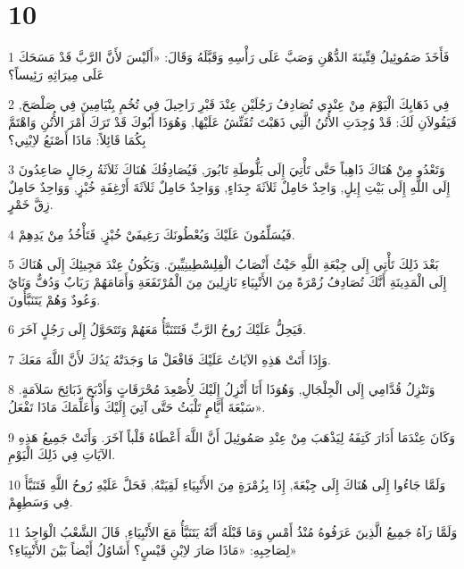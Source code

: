 \chapter{10}

\par 1 فَأَخَذَ صَمُوئِيلُ قِنِّينَةَ الدُّهْنِ وَصَبَّ عَلَى رَأْسِهِ وَقَبَّلَهُ وَقَالَ: «أَلَيْسَ لأَنَّ الرَّبَّ قَدْ مَسَحَكَ عَلَى مِيرَاثِهِ رَئِيساً؟
\par 2 فِي ذَهَابِكَ الْيَوْمَ مِنْ عِنْدِي تُصَادِفُ رَجُلَيْنِ عِنْدَ قَبْرِ رَاحِيلَ فِي تُخُمِ بِنْيَامِينَ فِي صَلْصَحَ, فَيَقُولاَنِ لَكَ: قَدْ وُجِدَتِ الأُتُنُ الَّتِي ذَهَبْتَ تُفَتِّشُ عَلَيْهَا, وَهُوَذَا أَبُوكَ قَدْ تَرَكَ أَمْرَ الأُتُنِ وَاهْتَمَّ بِكُمَا قَائِلاً: مَاذَا أَصْنَعُ لاِبْنِي؟
\par 3 وَتَعْدُو مِنْ هُنَاكَ ذَاهِباً حَتَّى تَأْتِيَ إِلَى بَلُّوطَةِ تَابُورَ, فَيُصَادِفُكَ هُنَاكَ ثَلاَثَةُ رِجَالٍ صَاعِدُونَ إِلَى اللَّهِ إِلَى بَيْتِ إِيلٍ, وَاحِدٌ حَامِلٌ ثَلاَثَةَ جِدَاءٍ, وَوَاحِدٌ حَامِلٌ ثَلاَثَةَ أَرْغِفَةِ خُبْزٍ, وَوَاحِدٌ حَامِلٌ زِقَّ خَمْرٍ.
\par 4 فَيُسَلِّمُونَ عَلَيْكَ وَيُعْطُونَكَ رَغِيفَيْ خُبْزٍ, فَتَأْخُذُ مِنْ يَدِهِمْ.
\par 5 بَعْدَ ذَلِكَ تَأْتِي إِلَى جِبْعَةِ اللَّهِ حَيْثُ أَنْصَابُ الْفِلِسْطِينِيِّينَ. وَيَكُونُ عِنْدَ مَجِيئِكَ إِلَى هُنَاكَ إِلَى الْمَدِينَةِ أَنَّكَ تُصَادِفُ زُمْرَةً مِنَ الأَنْبِيَاءِ نَازِلِينَ مِنَ الْمُرْتَفَعَةِ وَأَمَامَهُمْ رَبَابٌ وَدُفٌّ وَنَايٌ وَعُودٌ وَهُمْ يَتَنَبَّأُونَ.
\par 6 فَيَحِلُّ عَلَيْكَ رُوحُ الرَّبِّ فَتَتَنَبَّأُ مَعَهُمْ وَتَتَحَوَّلُ إِلَى رَجُلٍ آخَرَ.
\par 7 وَإِذَا أَتَتْ هَذِهِ الآيَاتُ عَلَيْكَ فَافْعَلْ مَا وَجَدَتْهُ يَدُكَ لأَنَّ اللَّهَ مَعَكَ.
\par 8 وَتَنْزِلُ قُدَّامِي إِلَى الْجِلْجَالِ, وَهُوَذَا أَنَا أَنْزِلُ إِلَيْكَ لِأُصْعِدَ مُحْرَقَاتٍ وَأَذْبَحَ ذَبَائِحَ سَلاَمَةٍ. سَبْعَةَ أَيَّامٍ تَلْبَثُ حَتَّى آتِيَ إِلَيْكَ وَأُعَلِّمَكَ مَاذَا تَفْعَلُ».
\par 9 وَكَانَ عِنْدَمَا أَدَارَ كَتِفَهُ لِيَذْهَبَ مِنْ عِنْدِ صَمُوئِيلَ أَنَّ اللَّهَ أَعْطَاهُ قَلْباً آخَرَ. وَأَتَتْ جَمِيعُ هَذِهِ الآيَاتِ فِي ذَلِكَ الْيَوْمِ.
\par 10 وَلَمَّا جَاءُوا إِلَى هُنَاكَ إِلَى جِبْعَةَ, إِذَا بِزُمْرَةٍ مِنَ الأَنْبِيَاءِ لَقِيَتْهُ, فَحَلَّ عَلَيْهِ رُوحُ اللَّهِ فَتَنَبَّأَ فِي وَسَطِهِمْ.
\par 11 وَلَمَّا رَآهُ جَمِيعُ الَّذِينَ عَرَفُوهُ مُنْذُ أَمْسِ وَمَا قَبْلَهُ أَنَّهُ يَتَنَبَّأُ مَعَ الأَنْبِيَاءِ, قَالَ الشَّعْبُ الْوَاحِدُ لِصَاحِبِهِ: «مَاذَا صَارَ لاِبْنِ قَيْسٍ؟ أَشَاوُلُ أَيْضاً بَيْنَ الأَنْبِيَاءِ؟»

